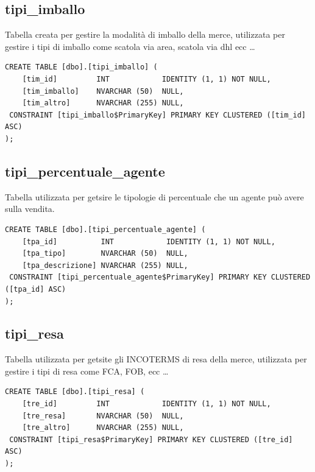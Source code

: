 \documentclass[12pt]{article}
\begin{document}
\subsection{tipi\_imballo}
Tabella creata per gestire la modalità di imballo della merce,
utilizzata per gestire i tipi di imballo come scatola via area, scatola via dhl ecc \dots
\begin{lstlisting}
CREATE TABLE [dbo].[tipi_imballo] (
    [tim_id]         INT            IDENTITY (1, 1) NOT NULL,
    [tim_imballo]    NVARCHAR (50)  NULL,
    [tim_altro]      NVARCHAR (255) NULL,
 CONSTRAINT [tipi_imballo$PrimaryKey] PRIMARY KEY CLUSTERED ([tim_id] ASC)
);
\end{lstlisting}

\subsection{tipi\_percentuale\_agente}
Tabella utilizzata per getsire le tipologie di percentuale che un agente può avere sulla vendita.
\begin{lstlisting}
CREATE TABLE [dbo].[tipi_percentuale_agente] (
    [tpa_id]          INT            IDENTITY (1, 1) NOT NULL,
    [tpa_tipo]        NVARCHAR (50)  NULL,
    [tpa_descrizione] NVARCHAR (255) NULL,
 CONSTRAINT [tipi_percentuale_agente$PrimaryKey] PRIMARY KEY CLUSTERED ([tpa_id] ASC)
);
\end{lstlisting}

\subsection{tipi\_resa}
Tabella utilizzata per getsite gli INCOTERMS di resa della merce, utilizzata per gestire i tipi di resa come FCA, FOB, ecc \dots
\begin{lstlisting}
CREATE TABLE [dbo].[tipi_resa] (
    [tre_id]         INT            IDENTITY (1, 1) NOT NULL,
    [tre_resa]       NVARCHAR (50)  NULL,
    [tre_altro]      NVARCHAR (255) NULL,
 CONSTRAINT [tipi_resa$PrimaryKey] PRIMARY KEY CLUSTERED ([tre_id] ASC)
);
\end{lstlisting}
\end{document}
